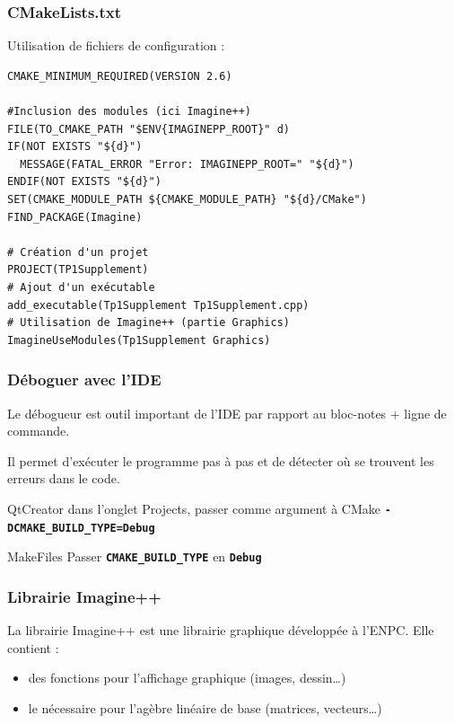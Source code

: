 \begin{frame}[fragile]
  \frametitle{CMakeLists.txt}


Utilisation de fichiers de configuration :
\begin{verbatim}  
CMAKE_MINIMUM_REQUIRED(VERSION 2.6)

#Inclusion des modules (ici Imagine++)
FILE(TO_CMAKE_PATH "$ENV{IMAGINEPP_ROOT}" d)
IF(NOT EXISTS "${d}")
  MESSAGE(FATAL_ERROR "Error: IMAGINEPP_ROOT=" "${d}")
ENDIF(NOT EXISTS "${d}")
SET(CMAKE_MODULE_PATH ${CMAKE_MODULE_PATH} "${d}/CMake")
FIND_PACKAGE(Imagine)

# Création d'un projet
PROJECT(TP1Supplement)
# Ajout d'un exécutable
add_executable(Tp1Supplement Tp1Supplement.cpp)
# Utilisation de Imagine++ (partie Graphics)
ImagineUseModules(Tp1Supplement Graphics)
\end{verbatim}
\end{frame}

\begin{frame}
	\frametitle{Déboguer avec l'IDE}
	Le débogueur est outil important de l'IDE par rapport au bloc-notes + ligne 
	de commande.

	Il permet d'exécuter le programme pas à pas et de détecter où se trouvent les erreurs dans le code.

	\begin{block}{QtCreator}
	dans l’onglet Projects, passer comme argument à CMake \textbf{\texttt{-DCMAKE\_BUILD\_TYPE=Debug}}
	\end{block}

	\begin{block}{MakeFiles}
	Passer \textbf{\texttt{CMAKE\_BUILD\_TYPE}} en \textbf{\texttt{Debug}}
	\end{block}

\end{frame}

\begin{frame}
  \frametitle{Librairie Imagine++}
  La librairie Imagine++ est une librairie graphique développée à l'ENPC.
  Elle contient :
  \begin{itemize}
      \item des fonctions pour l'affichage graphique (images, dessin\dots)
      \item le nécessaire pour l'agèbre linéaire de base (matrices, vecteurs\dots)
  \end{itemize}
\end{frame}


